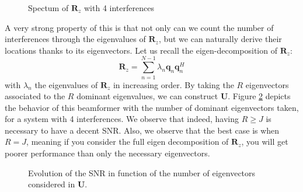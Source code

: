 \documentclass[12pt]{article}
\begin{document}
\begin{figure}[H]
    \centering
    
    \caption{Spectum of $\mathbf{R}_z$ with 4 interferences}
    \label{fig:spectrum}
\end{figure}

A very strong property of this is that not only can we count the number of interferences through the eigenvalues of $\mathbf{R}_z$, but we can naturally derive their locations thanks to its eigenvectors. Let us recall the eigen-decomposition of $\mathbf{R}_z$:
\begin{equation}
    \mathbf{R}_z = \sum_{n=1}^{N-1} \lambda_n\mathbf{q}_n\mathbf{q}_n^H
\end{equation}
with $\lambda_n$ the eigenvalues of $\mathbf{R}_z$ in increasing order. By taking the $R$ eigenvectors associated to the $R$ dominant eigenvalues, we can construct $\mathbf{U}$. Figure \ref{fig:eigen_decomposition} depicts the behavior of this beamformer with the number of dominant eigenvectors taken, for a system with 4 interferences. We observe that indeed, having $R\geq J$ is necessary to have a decent SNR. Also, we observe that the best case is when $R=J$, meaning if you consider the full eigen decomposition of $\mathbf{R}_z$, you will get poorer performance than only the necessary eigenvectors.

\begin{figure}[H]
    \centering
    
    \caption{Evolution of the SNR in function of the number of eigenvectors considered in $\mathbf{U}$.}
    \label{fig:eigen_decomposition}
\end{figure}
\end{document}
